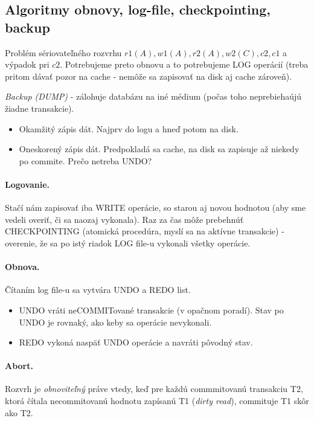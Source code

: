 \documentclass[10pt,a4paper]{article}
\begin{document}
\subsection{Algoritmy obnovy, log-file, checkpointing, backup}
    
Problém sériovateľného rozvrhu $r1(A), w1(A), r2(A), w2(C), c2, c1$ a výpadok pri $c2$.
Potrebujeme preto obnovu a to potrebujeme LOG operácií (treba pritom dávať pozor na cache - nemôže sa zapisovať na disk aj cache zároveň). 

\emph{Backup (DUMP)} - zálohuje databázu na iné médium (počas toho neprebiehaújú žiadne transakcie). 

\begin{itemize}
\item Okamžitý zápis dát. Najprv do logu a hneď potom na disk. 
\item Oneskorený zápis dát. Predpokladá sa cache, na disk sa zapisuje až niekedy po commite. Prečo netreba UNDO?
\end{itemize}

\paragraph{Logovanie.}
Stačí nám zapisovať iba WRITE operácie, so starou aj novou hodnotou (aby sme vedeli overiť, či sa naozaj vykonala).
Raz za čas môže prebehnúť CHECKPOINTING (atomická procedúra, myslí sa na aktívne transakcie) - overenie, že sa po istý riadok LOG file-u vykonali všetky operácie.  

\paragraph{Obnova.}
Čítaním log file-u sa vytvára UNDO a REDO list.

\begin{itemize}
\item UNDO vráti neCOMMITované transakcie (v opačnom poradí). Stav po UNDO je rovnaký, ako keby sa operácie nevykonali.  
\item REDO vykoná naspäť UNDO operácie a navráti pôvodný stav. 
\end{itemize}

\paragraph{Abort.}
Rozvrh je \emph{obnoviteľný} práve vtedy, keď pre každú commmitovanú transakciu T2, ktorá čítala necommitovanú hodnotu zapísanú T1 (\emph{dirty read}), commituje T1 skôr ako T2. 
\end{document}
